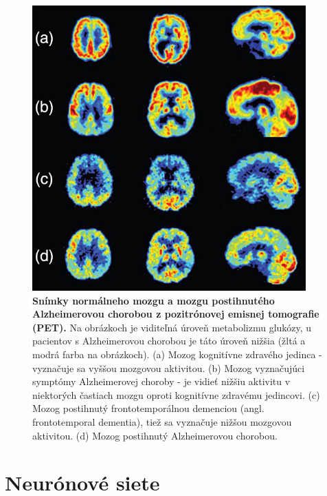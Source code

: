 \begin{figure}[h!]
\centering
\includegraphics[scale=0.5]{assets/images/pet.png}
\caption{\textbf{Snímky normálneho mozgu a mozgu postihnutého Alzheimerovou chorobou z pozitrónovej emisnej tomografie (PET).} \cite{khan2016biomarkers}
Na obrázkoch je viditeľná úroveň metabolizmu glukózy, u pacientov s Alzheimerovou chorobou je táto úroveň nižšia (žltá a modrá farba na obrázkoch).
(a) Mozog kognitívne zdravého jedinca - vyznačuje sa vyššou mozgovou aktivitou.
(b) Mozog vyznačujúci symptómy Alzheimerovej choroby - je vidieť nižšiu aktivitu v niektorých častiach mozgu oproti kognitívne zdravému jedincovi.
(c) Mozog postihnutý frontotemporálnou demenciou (angl. frontotemporal dementia), tiež sa vyznačuje nižšou mozgovou aktivitou.
(d) Mozog postihnutý Alzheimerovou chorobou.
} 
\label{fig:pet}
\end{figure}



\section{Neurónové siete}

